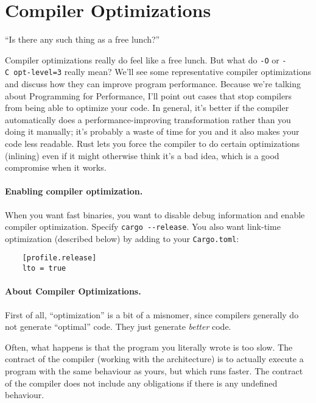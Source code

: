 




\section*{Compiler Optimizations}

\hfill ``Is there any such thing as a free lunch?''

Compiler optimizations really do feel like a free lunch.
But what do {\tt -O} or
{\tt -C~opt-level=3} really mean?
We'll see some representative compiler optimizations and discuss how
they can improve program performance. Because we're talking about
Programming for Performance, I'll point out cases that stop compilers
from being able to optimize your code. In general, it's better if the
compiler automatically does a performance-improving transformation
rather than you doing it manually; it's probably a waste of time for
you and it also makes your code less readable. Rust lets you force the compiler to do certain optimizations (inlining) even if it might otherwise think it's a bad idea, which is a good compromise when it works.

\paragraph{Enabling compiler optimization.} When you want fast binaries, you want to disable debug information and enable compiler optimization. Specify \texttt{cargo~-{}-release}. You also want link-time optimization (described below) by adding to your \texttt{Cargo.toml}:
\begin{verbatim}
    [profile.release]
    lto = true
\end{verbatim}

\paragraph{About Compiler Optimizations.} First of all, ``optimization'' is
a bit of a misnomer, since compilers generally do not generate ``optimal'' code.
They just generate \emph{better} code.

Often, what happens is that the program you literally wrote is too slow. The
contract of the compiler (working with the architecture) is to actually execute
a program with the same behaviour as yours, but which runs faster. The contract of the compiler
does not include any obligations if there is any undefined behaviour.

